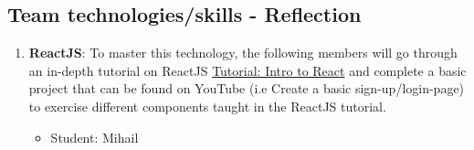 \documentclass{article}
\begin{document}
\subsection{Team technologies/skills - Reflection  }
\begin{enumerate}
    \item \textbf{ReactJS}: To master this technology, the following members will go through an in-depth tutorial on ReactJS \href{https://reactjs.org/tutorial/tutorial.html}{Tutorial: Intro to React} and complete a basic project that can be found on YouTube (i.e Create a basic sign-up/login-page) to exercise different components taught in the ReactJS tutorial.
        \begin{itemize}
            \item Student: Mihail
        \end{itemize}
    

\end{enumerate}
\end{document}
